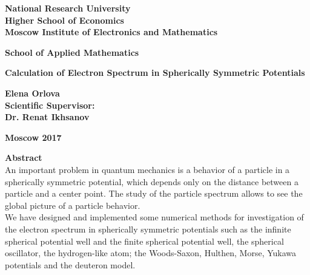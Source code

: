 \documentclass[a4paper, 11pt]{article}
\begin{document}
	\thispagestyle{empty}
	\begin{center}
		\large
		\textbf{National Research University}			
		\\
		\textbf{Higher School of Economics}									\\[3 cm]
		\textbf{Moscow Institute of Electronics and Mathematics}			\\[2 cm]
									
	\end{center}
	
	\begin{center}
		\large
		\textbf{School of Applied Mathematics}		\\[3 cm]
	\end{center}
	
	
	
	\begin{center}
		\large
		\textbf{Calculation of Electron Spectrum in Spherically Symmetric Potentials}		\\[6 cm]
		
	\end{center}
	
	\begin{flushright}
		\large
		\textbf{Elena Orlova}				\\
		\textbf{Scientific Supervisor:}			\\
		\textbf{Dr. Renat Ikhsanov}		\\
	\end{flushright}
	
	\vfill
	\begin{center}
		\large
		\textbf{Moscow 2017}
	\end{center}
	\pagebreak
	
	
	


\tableofcontents
\pagebreak

\textbf{Abstract}\\
An important problem in quantum mechanics is a behavior of a particle in a spherically symmetric potential, which depends only on the distance between a particle and a center point. The study of the particle spectrum allows to see the global picture of a particle behavior.\\
We have designed and implemented some numerical methods for investigation of the electron spectrum in spherically symmetric potentials such as the infinite spherical potential well and the finite spherical potential well, the spherical oscillator, the hydrogen-like atom; the Woods-Saxon, Hulthen, Morse, Yukawa potentials and the deuteron model.
\end{document}
